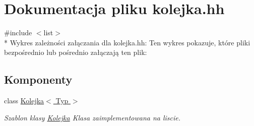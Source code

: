 \hypertarget{kolejka_8hh}{\section{Dokumentacja pliku kolejka.\-hh}
\label{kolejka_8hh}
}
{\ttfamily \#include $<$list$>$}\\*
Wykres zależności załączania dla kolejka.\-hh\-:
Ten wykres pokazuje, które pliki bezpośrednio lub pośrednio załączają ten plik\-:
\subsection*{Komponenty}
\begin{DoxyCompactItemize}
\item 
class \hyperlink{class_kolejka}{Kolejka$<$ Typ $>$}
\begin{DoxyCompactList}\small\item\em Szablon klasy \hyperlink{class_kolejka}{Kolejka} Klasa zaimplementowana na liscie. \end{DoxyCompactList}\end{DoxyCompactItemize}
